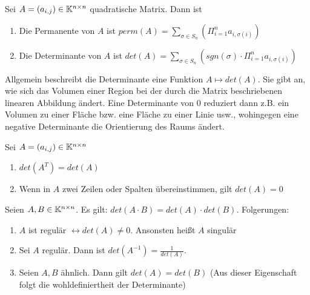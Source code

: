 \begin{definition}
	Sei $A = (a_{i,j}) \in \mathbb{K}^{n \times n}$ quadratische Matrix. Dann ist
	\begin{enumerate}[noitemsep]
		\item Die Permanente von $A$ ist $perm(A) = \sum_{\sigma \in S_n}(\Pi_{i=1}^n a_ {i, \sigma(i)})$
		\item Die Determinante von $A$ ist $det(A) = \sum_{\sigma \in S_n}(sgn(\sigma) \cdot \Pi_{i=1}^n a_ {i, \sigma(i)})$		
	\end{enumerate}
	Allgemein beschreibt die Determinante eine Funktion $A \mapsto det(A)$. Sie gibt an, wie sich das Volumen einer Region bei der durch die Matrix beschriebenen linearen Abbildung ändert. Eine Determinante von 0 reduziert dann z.B. ein Volumen zu einer Fläche bzw. eine Fläche zu einer Linie usw., wohingegen eine negative Determinante die Orientierung des Raums ändert.
\end{definition}

\begin{satz}
	Sei $A = (a_{i,j}) \in \mathbb{K}^{n \times n}$
	\begin{enumerate}[noitemsep]
		\item $det(A^T) = det(A)$
		\item Wenn in $A$ zwei Zeilen oder Spalten übereinstimmen, gilt $det(A) = 0$
	\end{enumerate}
\end{satz}

\begin{satz}[Determinantenmultiplikationssatz]
	Seien $A,B \in \mathbb{K}^{n \times n}$. Es gilt: $det(A \cdot B) = det(A) \cdot det(B)$. Folgerungen:
	
	\begin{enumerate}[noitemsep]
		\item $A$ ist regulär $\leftrightarrow det(A) \neq 0$. Ansonsten heißt $A$ singulär
		\item Sei $A$ regulär. Dann ist $det(A^{-1}) = \frac{1}{det(A)}$.
		\item Seien $A,B$ ähnlich. Dann gilt $det(A) = det(B)$ (Aus dieser Eigenschaft folgt die wohldefiniertheit der Determinante)
	\end{enumerate}
\end{satz}

